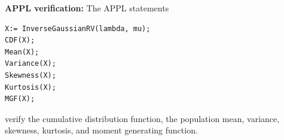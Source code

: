 \documentclass[12pt,fullpage]{article}
\begin{document}
\vspace{0.1in}

\noindent
{\bf APPL verification:}
The APPL statements
\begin{verbatim}
X:= InverseGaussianRV(lambda, mu);
CDF(X);
Mean(X);
Variance(X);
Skewness(X);
Kurtosis(X);
MGF(X);
\end{verbatim}
verify the cumulative distribution function, the population mean, variance, skewness, kurtosis,  and moment generating function.
\end{document}
